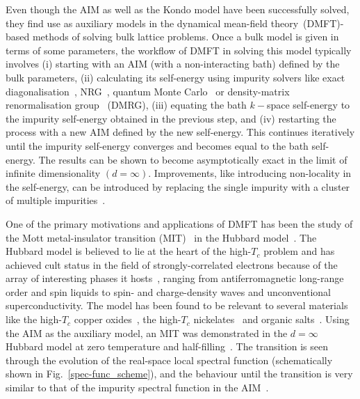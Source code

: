 \documentclass[reprint,superscriptaddress,floatfix]{revtex4-2}
\begin{document}
Even though the AIM as well as the Kondo model have been successfully solved, they find use as auxiliary models in the dynamical mean-field theory~\cite{kuramoto1987,Cox1988,metzner_volhardt_1989,kotliar1992}(DMFT)-based methods of solving bulk lattice problems.
Once a bulk model is given in terms of some parameters, the workflow of DMFT in solving this model typically involves (i) starting with an AIM (with a non-interacting bath) defined by the bulk parameters, (ii) calculating its self-energy using impurity solvers like exact diagonalisation~\cite{stanescu_2006,capone2007,sakai_2009}, NRG~\cite{bulla_1998,bulla_1999,bulla2001,zitzler_2004}, quantum Monte Carlo~\cite{hirsch1986,rozenberg1997,gull_2011} or density-matrix renormalisation group~\cite{white1992,peschel_1999,garcia2004,schollwock2005,hallberg2006,garcia2007,garcia2007_prb} (DMRG), (iii) equating the bath \(k-\)space self-energy to the impurity self-energy obtained in the previous step, and (iv) restarting the process with a new AIM defined by the new self-energy.
This continues iteratively until the impurity self-energy converges and becomes equal to the bath self-energy.
The results can be shown to become asymptotically exact in the limit of infinite dimensionality \((d=\infty)\).
Improvements, like introducing non-locality in the self-energy, can be introduced by replacing the single impurity with a cluster of multiple impurities~\cite{parcollet_2004,maier_2005,kotliar_rmp_2006,ohashi_2008}. 

One of the primary motivations and applications of DMFT has been the study of the Mott metal-insulator transition (MIT)~\cite{Mott_1949} in the Hubbard model~\cite{gutzwiller_1963,kanamori_1963,hubbard1963electron}.
The Hubbard model is believed to lie at the heart of the high-\(T_c\) problem and has achieved cult status in the field of strongly-correlated electrons because of the array of interesting phases it hosts~\cite{keimer2015quantum,arovas_2022,qin_2022}, ranging from antiferromagnetic long-range order and spin liquids to spin- and charge-density waves and unconventional superconductivity.
The model has been found to be relevant to several materials like the high-\(T_c\) copper oxides~\cite{zhangrice-physrevb.37.3759}, the high-\(T_c\) nickelates~\cite{Kitatani2020} and organic salts~\cite{scriven_2009}.
Using the AIM as the auxiliary model, an MIT was demonstrated in the \(d=\infty\) Hubbard model at zero temperature and half-filling~\cite{zhang_1993}. The transition is seen through the evolution of the real-space local spectral function (schematically shown in Fig.~\ref{spec-func_scheme}), and the behaviour until the transition is very similar to that of the impurity spectral function in the AIM~\cite{hewson1993}.
\end{document}
